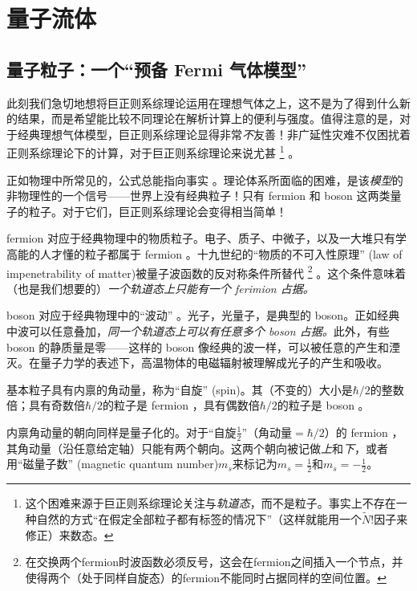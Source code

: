 \chapter{量子流体}\label{chap18}
\section{量子粒子：一个“预备 Fermi 气体模型”}\label{sec18.1}
此刻我们急切地想将巨正则系综理论运用在理想气体之上，这不是为了得到什么新的结果，而是希望能比较不同理论在解析计算上的便利与强度。值得注意的是，对于经典理想气体模型，巨正则系综理论显得非常{\it 不}友善！非广延性灾难不仅困扰着正则系综理论下的计算，对于巨正则系综理论来说尤甚%
\footnote{这个困难来源于巨正则系综理论关注与{\it 轨道态}，而不是粒子。事实上不存在一种自然的方式``在假定全部粒子都有标签的情况下''（这样就能用一个$\tilde N!$因子来修正）来数态。}%
。

正如物理中所常见的，公式总能指向事实%
%
。理论体系所面临的困难，是该{\it 模型}的非物理性的一个信号——世界上没有经典粒子！只有 fermion 和 boson 这两类量子的粒子。对于它们，巨正则系综理论会变得相当简单！

fermion 对应于经典物理中的物质粒子。电子、质子、中微子，以及一大堆只有学高能的人才懂的粒子都属于 fermion 。十九世纪的``物质的不可入性原理'' (law of impenetrability of matter)被量子波函数的反对称条件所替代%
\footnote{在交换两个fermion时波函数必须反号，这会在fermion之间插入一个节点，并使得两个（处于同样自旋态）的fermion不能同时占据同样的空间位置。}%
。这个条件意味着（也是我们想要的）{\it 一个轨道态上只能有一个 ferimion 占据。}

boson 对应于经典物理中的``波动''%
%
。光子，光量子，是典型的 boson。正如经典中波可以任意叠加，{\it 同一个轨道态上可以有任意多个 boson 占据。}此外，有些 boson 的静质量是零——这样的 boson 像经典的波一样，可以被任意的产生和湮灭。在量子力学的表述下，高温物体的电磁辐射被理解成光子的产生和吸收。

基本粒子具有内禀的角动量，称为``自旋'' (spin)。其（不变的）大小是$\hbar/2$的整数倍；具有奇数倍$\hbar/2$的粒子是 fermion ，具有偶数倍$\hbar/2$的粒子是 boson 。

内禀角动量的朝向同样是量子化的。对于``自旋$\frac{1}{2}$''（角动量$=\hbar/2$）的 fermion ，其角动量（沿任意给定轴）只能有两个朝向。这两个朝向被记做{\it 上}和{\it 下}，或者用``磁量子数'' (magnetic quantum number)$m_s$来标记为$m_s=\frac{1}{2}$和$m_s=-\frac{1}{2}$。

